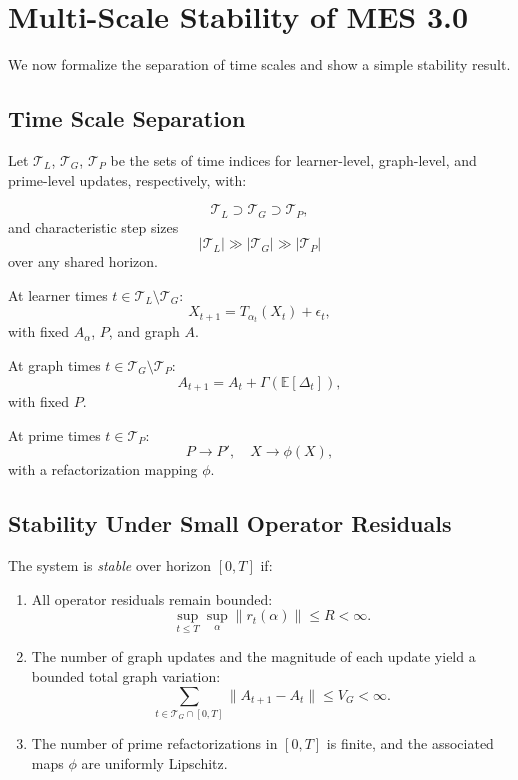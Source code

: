\documentclass[11pt]{article}
\begin{document}
\section{Multi-Scale Stability of MES 3.0}

We now formalize the separation of time scales and show a simple stability result.

\subsection{Time Scale Separation}

Let $\mathcal{T}_L$, $\mathcal{T}_G$, $\mathcal{T}_P$ be the sets of time indices for learner-level, graph-level, and prime-level updates, respectively, with:

\[
  \mathcal{T}_L \supset \mathcal{T}_G \supset \mathcal{T}_P,
\]
and characteristic step sizes
\[
  |\mathcal{T}_L| \gg |\mathcal{T}_G| \gg |\mathcal{T}_P|
\]
over any shared horizon.

At learner times $t \in \mathcal{T}_L \setminus \mathcal{T}_G$:
\[
  X_{t+1} = T_{\alpha_t}(X_t) + \epsilon_t,
\]
with fixed $A_\alpha$, $P$, and graph $A$.

At graph times $t \in \mathcal{T}_G \setminus \mathcal{T}_P$:
\[
  A_{t+1} = A_t + \Gamma(\mathbb{E}[\Delta_t]),
\]
with fixed $P$.

At prime times $t \in \mathcal{T}_P$:
\[
  P \to P', \quad X \to \phi(X),
\]
with a refactorization mapping $\phi$.

\subsection{Stability Under Small Operator Residuals}

\begin{definition}
The system is \emph{stable} over horizon $[0,T]$ if:
\begin{enumerate}
  \item All operator residuals remain bounded:
  \[
    \sup_{t \le T} \sup_\alpha \|r_t(\alpha)\| \le R < \infty.
  \]
  \item The number of graph updates and the magnitude of each update yield a bounded total graph variation:
  \[
    \sum_{t \in \mathcal{T}_G \cap [0,T]} \|A_{t+1} - A_t\| \le V_G < \infty.
  \]
  \item The number of prime refactorizations in $[0,T]$ is finite, and the associated maps $\phi$ are uniformly Lipschitz.
\end{enumerate}
\end{definition}
\end{document}
